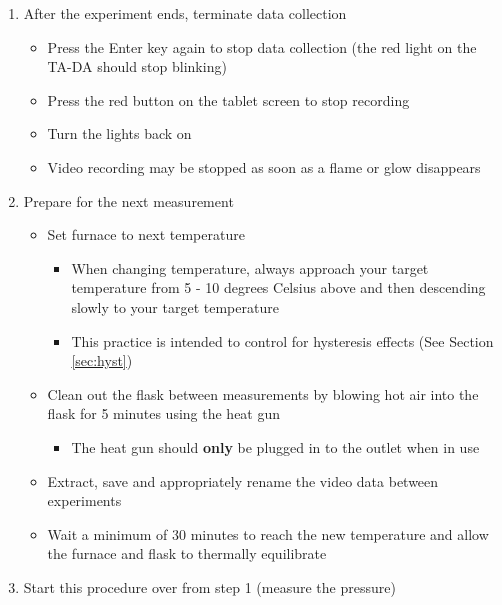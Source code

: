 \documentclass[letterpaper,11pt]{article}
\begin{document}
\begin{enumerate}
    \item After the experiment ends, terminate data collection
        \begin{itemize}
        \item Press the Enter key  again to stop data 
            collection (the red light on the TA-DA should stop blinking)
        \item Press the red button on the tablet screen to stop recording
        \item Turn the lights back on
        \item Video recording may be stopped as soon as a flame or glow
            disappears
        \end{itemize}

    \item Prepare for the next measurement
        \begin{itemize}
        \item Set furnace to next temperature
            \begin{itemize}
            \item When changing temperature, always approach your target
                temperature from 5 - 10 degrees Celsius above and then 
                descending slowly to your target temperature
            \item This practice is intended to control for hysteresis effects
                (See Section \ref{sec:hyst})
            \end{itemize}
        \item Clean out the flask between measurements by blowing hot air into 
            the flask for 5 minutes using the heat gun
            \begin{itemize}
            \item The heat gun should \textbf{only} be plugged in to the outlet 
                when in  use
            \end{itemize}

        \item Extract, save and appropriately rename the video data between 
            experiments
        \item Wait a minimum of 30 minutes to reach the new temperature and 
            allow the furnace and flask to thermally equilibrate
        \end{itemize}
    
    \item Start this procedure over from step 1 (measure the pressure)
    \end{enumerate}
    
\end{document}

